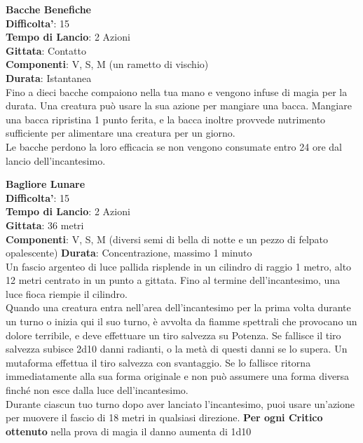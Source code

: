 \begin{multicols}{2}
\medskip\textbf{Bacche Benefiche}\\
\textbf{Difficolta'}: 15\\
\textbf{Tempo di Lancio}: 2 Azioni\\
\textbf{Gittata}: Contatto\\
\textbf{Componenti}: V, S, M (un rametto di vischio)\\
\textbf{Durata}: Istantanea\\
Fino a dieci bacche compaiono nella tua mano e vengono infuse di magia per la durata. Una creatura può usare la sua azione per mangiare una bacca. Mangiare una bacca ripristina 1 punto ferita, e la bacca inoltre provvede nutrimento sufficiente per alimentare una creatura per un giorno.\\
Le bacche perdono la loro efficacia se non vengono consumate entro 24 ore dal lancio dell’incantesimo. 

\medskip\textbf{Bagliore Lunare}\\
\textbf{Difficolta'}: 15\\
\textbf{Tempo di Lancio}: 2 Azioni\\
\textbf{Gittata}: 36 metri\\
\textbf{Componenti}: V, S, M (diversi semi di bella di notte e un pezzo di felpato opalescente)
\textbf{Durata}: Concentrazione, massimo 1 minuto\\
Un fascio argenteo di luce pallida risplende in un cilindro di raggio 1 metro, alto 12 metri centrato in un punto a gittata. Fino al termine dell’incantesimo, una luce fioca riempie il cilindro. \\
Quando una creatura entra nell’area dell’incantesimo per la prima volta durante un turno o inizia qui il suo turno, è avvolta da fiamme spettrali che provocano un dolore terribile, e deve effettuare un tiro salvezza su Potenza. Se fallisce il tiro salvezza subisce 2d10 danni radianti, o la metà di questi danni se lo supera. Un mutaforma effettua il tiro salvezza con svantaggio. Se lo fallisce ritorna immediatamente alla sua forma originale e non può assumere una forma diversa finché non esce dalla luce dell’incantesimo.\\
Durante ciascun tuo turno dopo  aver lanciato l’incantesimo, puoi usare un’azione per muovere il
fascio di 18 metri in qualsiasi direzione. 
\textbf{Per ogni Critico ottenuto} nella prova di magia il danno aumenta di 1d10



\end{multicols}
